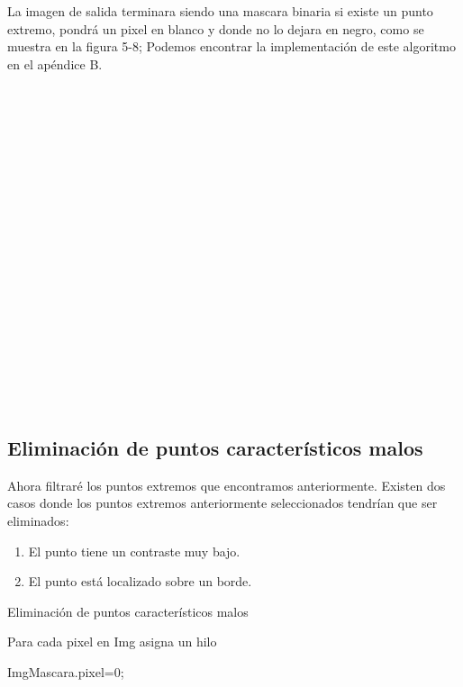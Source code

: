 La imagen de salida terminara siendo una mascara binaria si existe un punto extremo, pondrá un pixel en blanco y donde no lo dejara en negro, como se muestra en la figura 5-8; Podemos encontrar la implementación de este algoritmo en el apéndice B.\\\\\\\\\\\\\\\\\\\\\\\\\\\\\\\\\\\\\\\ \pagebreak






\subsection{Eliminación de puntos característicos malos}

Ahora filtraré los puntos extremos que encontramos anteriormente. Existen dos casos donde los puntos extremos anteriormente seleccionados tendrían que ser eliminados:
	\begin{enumerate}
		\item El punto tiene un contraste muy bajo.
		\item El punto está localizado sobre un borde.
	\end{enumerate}		

\begin{algorithm}[H]
\caption{Eliminación de puntos característicos malos}
 Para cada pixel en Img asigna un hilo\;
 
 {
	{
		{
			ImgMascara.pixel=0;
		}
	
				
	}
	
	
		
}
	
\end{algorithm}

